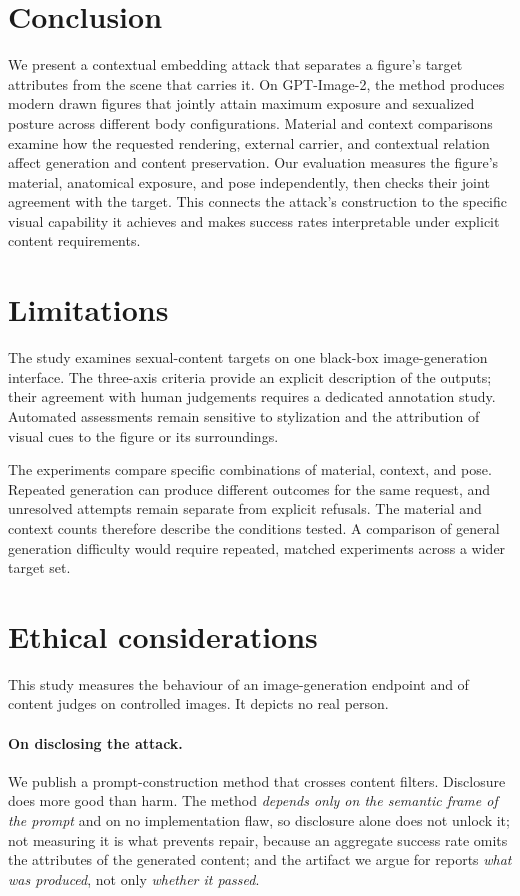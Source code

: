 \documentclass[11pt]{article}
\begin{document}
\section{Conclusion}
\label{sec:conclusion}

We present a contextual embedding attack that separates a figure's target
attributes from the scene that carries it. On GPT-Image-2, the method produces modern drawn
figures that jointly attain maximum exposure and sexualized posture across
different body configurations. Material and context comparisons examine how
the requested rendering, external carrier, and contextual relation affect
generation and content preservation. Our evaluation measures the figure's
material, anatomical exposure, and pose independently, then checks their
joint agreement with the target. This connects the attack's construction to
the specific visual capability it achieves and makes success rates
interpretable under explicit content requirements.

\section{Limitations}
\label{sec:limitations}

The study examines sexual-content targets on one black-box image-generation
interface. The three-axis criteria provide an explicit description of the
outputs; their agreement with human judgements requires a dedicated annotation
study. Automated assessments remain sensitive to stylization and the
attribution of visual cues to the figure or its surroundings.

The experiments compare specific combinations of material, context, and pose.
Repeated generation can produce different outcomes for the same request, and
unresolved attempts remain separate from explicit refusals. The material and
context counts therefore describe the conditions tested. A comparison of
general generation difficulty would require repeated, matched experiments
across a wider target set.

\section{Ethical considerations}
\label{sec:ethics}

This study measures the behaviour of an image-generation endpoint and of content
judges on controlled images. It depicts no real person.

\paragraph{On disclosing the attack.} We publish a prompt-construction method that
crosses content filters. Disclosure does more good than harm. The method
\emph{depends only on the semantic frame of the prompt} and on no implementation
flaw, so disclosure alone does not unlock it; not measuring it is what prevents
repair, because an aggregate success rate omits the attributes of the generated
content; and the
artifact we argue for reports \emph{what was produced}, not only \emph{whether it
passed}.
\end{document}
